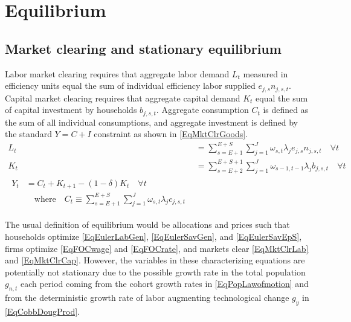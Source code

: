 \chapter{Equilibrium}
%



\begin{spacing}{1.5}

 \section{Market clearing and stationary equilibrium}\label{SecMCEqlbm}

    Labor market clearing requires that aggregate labor demand $L_t$ measured in efficiency units equal the sum of individual efficiency labor supplied $e_{j,s}n_{j,s,t}$. Capital market clearing requires that aggregate capital demand $K_t$ equal the sum of capital investment by households $b_{j,s,t}$. Aggregate consumption $C_t$ is defined as the sum of all individual consumptions, and aggregate investment is defined by the standard $Y = C + I$ constraint as shown in \eqref{EqMktClrGoods}.
    \begin{align}
      L_t &= \sum_{s=E+1}^{E+S}\sum_{j=1}^{J} \omega_{s,t}\lambda_j e_{j,s}n_{j,s,t} \quad \forall t \label{EqMktClrLab} \\
      K_t &= \sum_{s=E+2}^{E+S+1}\sum_{j=1}^{J}\omega_{s-1,t-1}\lambda_j b_{j,s,t}  \quad \forall t \label{EqMktClrCap} \\
      \begin{split}
        Y_t &= C_t + K_{t+1} - (1-\delta)K_t \quad\forall t \\
        &\quad\text{where}\quad C_t \equiv \sum_{s=E+1}^{E+S}\sum_{j=1}^{J}\omega_{s,t}\lambda_j c_{j,s,t}
      \end{split} \label{EqMktClrGoods}
    \end{align}

    The usual definition of equilibrium would be allocations and prices such that households optimize \eqref{EqEulerLabGen}, \eqref{EqEulerSavGen}, and \eqref{EqEulerSavEpS}, firms optimize \eqref{EqFOCwage} and \eqref{EqFOCrate}, and markets clear \eqref{EqMktClrLab} and \eqref{EqMktClrCap}. However, the variables in these characterizing equations are potentially not stationary due to the possible growth rate in the total population $g_{n,t}$ each period coming from the cohort growth rates in \eqref{EqPopLawofmotion} and from the deterministic growth rate of labor augmenting technological change $g_y$ in \eqref{EqCobbDougProd}.


\end{spacing}
